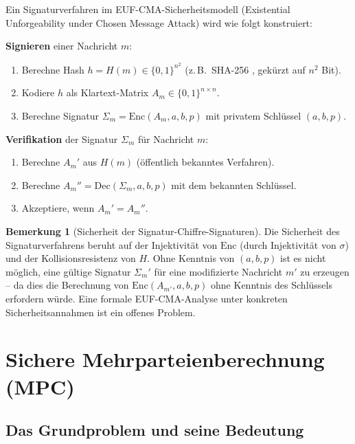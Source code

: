 ﻿\documentclass[a4paper,12pt]{scrreprt}
\theoremstyle{definition}
\newtheorem{bemerkung}{Bemerkung}[section]
\begin{document}
Ein Signaturverfahren im EUF-CMA-Sicherheitsmodell \cite{GMR88} (Existential Unforgeability under Chosen Message Attack) wird wie folgt konstruiert:

\textbf{Signieren} einer Nachricht $m$:
\begin{enumerate}
    \item Berechne Hash $h = H(m) \in \{0,1\}^{n^2}$ (z.\,B.\ SHA-256 \cite{NIST15a}, gekürzt auf $n^2$ Bit).
    \item Kodiere $h$ als Klartext-Matrix $A_m \in \{0,1\}^{n \times n}$.
    \item Berechne Signatur $\Sigma_m = \mathrm{Enc}(A_m, a, b, p)$ mit privatem Schlüssel $(a,b,p)$.
\end{enumerate}

\textbf{Verifikation} der Signatur $\Sigma_m$ für Nachricht $m$:
\begin{enumerate}
    \item Berechne $A_m'$ aus $H(m)$ (öffentlich bekanntes Verfahren).
    \item Berechne $A_m'' = \mathrm{Dec}(\Sigma_m, a, b, p)$ mit dem bekannten Schlüssel.
    \item Akzeptiere, wenn $A_m' = A_m''$.
\end{enumerate}

\begin{bemerkung}[Sicherheit der Signatur-Chiffre-Signaturen]
Die Sicherheit des Signaturverfahrens beruht auf der Injektivität von $\mathrm{Enc}$ (durch Injektivität von $\sigma$) und der Kollisionsresistenz von $H$. Ohne Kenntnis von $(a,b,p)$ ist es nicht möglich, eine gültige Signatur $\Sigma_m'$ für eine modifizierte Nachricht $m'$ zu erzeugen -- da dies die Berechnung von $\mathrm{Enc}(A_{m'}, a, b, p)$ ohne Kenntnis des Schlüssels erfordern würde. Eine formale EUF-CMA-Analyse unter konkreten Sicherheitsannahmen ist ein offenes Problem.
\end{bemerkung}

\section{Sichere Mehrparteienberechnung (MPC)}

\subsection{Das Grundproblem und seine Bedeutung}
\end{document}
